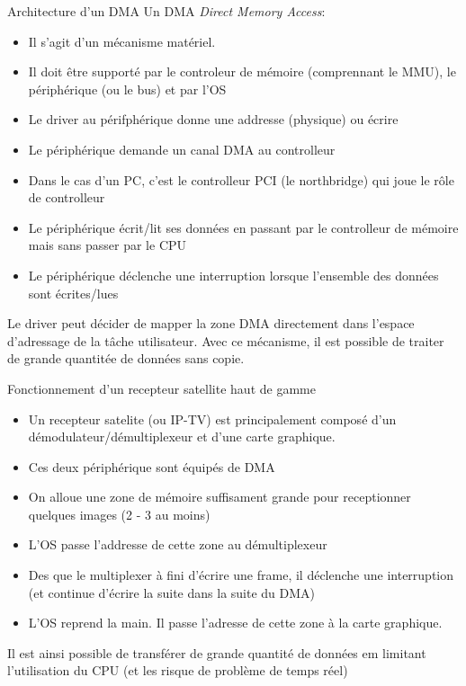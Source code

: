 \begin{frame}[fragile=singleslide]{Architecture d'un DMA}
  Un DMA \emph{Direct Memory Access}:
  \begin{itemize}
  \item Il s'agit d'un mécanisme matériel.
  \item  Il   doit  être  supporté   par  le  controleur   de  mémoire
    (comprennant le MMU), le périphérique (ou le bus) et par l'OS
  \item Le  driver au périfphérique  donne une addresse  (physique) ou
    écrire
  \item Le périphérique demande un canal DMA au controlleur
  \item Dans le cas d'un PC, c'est le controlleur PCI (le northbridge)
    qui joue le rôle de controlleur
  \item  Le  périphérique écrit/lit  ses  données  en  passant par  le
    controlleur de mémoire mais sans passer par le CPU
  \item Le périphérique  déclenche une interruption lorsque l'ensemble
    des données sont écrites/lues
  \end{itemize}
  Le  driver peut  décider  de  mapper la  zone  DMA directement  dans
  l'espace d'adressage de la  tâche utilisateur. Avec ce mécanisme, il
  est possible de traiter de grande quantitée de données sans copie.
\end{frame}

\begin{frame}[fragile=singleslide]{Fonctionnement    d'un    recepteur
    satellite haut de gamme}
  \begin{itemize}
  \item Un  recepteur satelite  (ou IP-TV) est  principalement composé
    d'un démodulateur/démultiplexeur et d'une carte graphique.
  \item Ces deux périphérique sont équipés de DMA
  \item  On  alloue  une  zone  de  mémoire  suffisament  grande  pour
    receptionner quelques images (2 - 3 au moins)
  \item L'OS passe l'addresse de cette zone au démultiplexeur
  \item Des que le multiplexer à fini d'écrire une frame, il déclenche
    une interruption (et  continue d'écrire la suite dans  la suite du
    DMA)
  \item L'OS  reprend la main. Il  passe l'adresse de cette  zone à la
    carte graphique.
  \end{itemize}
  Il est ainsi possible de transférer de grande quantité de données em
  limitant l'utilisation  du CPU (et  les risque de problème  de temps
  réel)
\end{frame}

